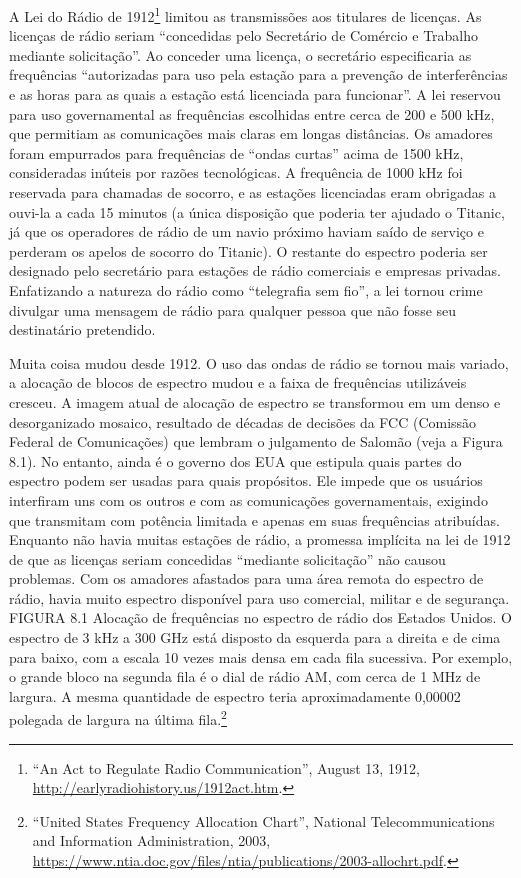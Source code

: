 \documentclass{book}
\begin{document}
A Lei do Rádio de 1912\footnote{``An Act to Regulate Radio Communication'',
August 13, 1912, \url{http://earlyradiohistory.us/1912act.htm}.} limitou as
transmissões aos titulares de licenças. As licenças de rádio seriam ``concedidas
pelo Secretário de Comércio e Trabalho mediante solicitação''. Ao conceder uma
licença, o secretário especificaria as frequências ``autorizadas para uso pela
estação para a prevenção de interferências e as horas para as quais a estação
está licenciada para funcionar''. A lei reservou para uso governamental as
frequências escolhidas entre cerca de 200 e 500 kHz, que permitiam as comunicações
mais claras em longas distâncias. Os amadores foram empurrados para frequências
de ``ondas curtas'' acima de 1500 kHz, consideradas inúteis por razões tecnológicas.
A frequência de 1000 kHz foi reservada para chamadas de socorro, e as estações
licenciadas eram obrigadas a ouvi-la a cada 15 minutos (a única disposição que
poderia ter ajudado o Titanic, já que os operadores de rádio de um navio próximo
haviam saído de serviço e perderam os apelos de socorro do Titanic). O restante
do espectro poderia ser designado pelo secretário para estações de rádio comerciais
e empresas privadas. Enfatizando a natureza do rádio como ``telegrafia sem fio'',
a lei tornou crime divulgar uma mensagem de rádio para qualquer pessoa que não
fosse seu destinatário pretendido.

Muita coisa mudou desde 1912. O uso das ondas de rádio se tornou mais variado, a
alocação de blocos de espectro mudou e a faixa de frequências utilizáveis cresceu.
A imagem atual de alocação de espectro se transformou em um denso e desorganizado
mosaico, resultado de décadas de decisões da FCC (Comissão Federal de Comunicações)
que lembram o julgamento de Salomão (veja a Figura 8.1). No entanto, ainda é o
governo dos EUA que estipula quais partes do espectro podem ser usadas para quais
propósitos. Ele impede que os usuários interfiram uns com os outros e com as
comunicações governamentais, exigindo que transmitam com potência limitada e
apenas em suas frequências atribuídas. Enquanto não havia muitas estações de rádio,
a promessa implícita na lei de 1912 de que as licenças seriam concedidas ``mediante
solicitação'' não causou problemas. Com os amadores afastados para uma área remota
do espectro de rádio, havia muito espectro disponível para uso comercial, militar
e de segurança.\\

FIGURA 8.1 Alocação de frequências no espectro de rádio dos Estados Unidos. O
espectro de 3 kHz a 300 GHz está disposto da esquerda para a direita e de cima
para baixo, com a escala 10 vezes mais densa em cada fila sucessiva. Por exemplo,
o grande bloco na segunda fila é o dial de rádio AM, com cerca de 1 MHz de largura.
A mesma quantidade de espectro teria aproximadamente 0,00002 polegada de largura
na última fila.\footnote{``United States Frequency Allocation Chart'', National
Telecommunications and Information Administration, 2003,
\url{https://www.ntia.doc.gov/files/ntia/publications/2003-allochrt.pdf}.}\\
\end{document}
